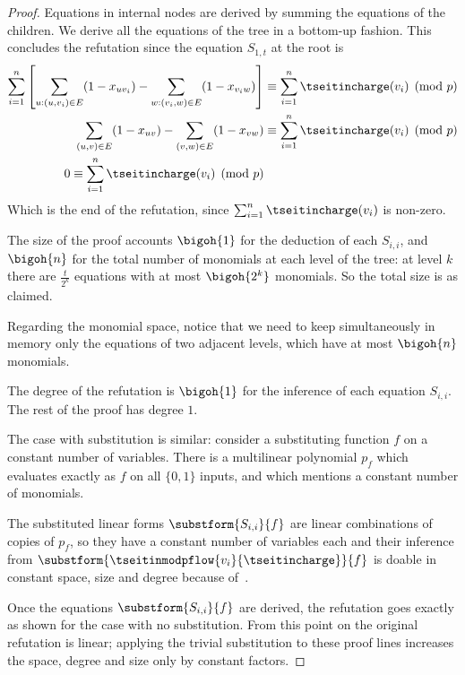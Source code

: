 \documentclass[11pt]{article}
\numberwithin{equation}{section}
\theoremstyle{definition}
\theoremstyle{plain}
\begin{document}
\begin{proof}
  Equations in internal nodes are derived by summing the
  equations of the children. We derive all the equations of the tree
  in a bottom-up fashion. This concludes the refutation since the
  equation $S_{1,t}$ at the root is
  \begin{align}
    \sum^{n}_{i=1}
    \left[
    \sum_{u:(u,v_{i})\in E} (1-x_{uv_{i}}) -\sum_{w:(v_{i},w)\in E} (1-x_{v_{i}w})
    \right]
    & \equiv \sum^{n}_{i=1} \tseitincharge(v_{i}) \pmod{p}
    \\
    \sum_{(u,v)\in E} (1-x_{uv}) -\sum_{(v,w)\in E} (1-x_{vw})
    & \equiv \sum^{n}_{i=1} \tseitincharge(v_{i}) \pmod{p}\\
    0 \equiv \sum^{n}_{i=1} \tseitincharge(v_{i}) \pmod{p}
  \end{align}
  Which is the end of the refutation, since $\sum^{n}_{i=1} \tseitincharge(v_{i})$
  is non-zero.

  The size of the proof accounts $\bigoh{1}$ for the deduction of each $S_{i,i}$, and $\bigoh{n}$ for the total number of monomials at each level of the tree: at level $k$ there are $\frac{t}{2^{k}}$ equations with at most  $\bigoh{2^{k}}$ monomials. So the total size is as claimed.

  Regarding the monomial space, notice that we need to keep simultaneously in memory only the equations of two adjacent levels, which have at most $\bigoh{n}$ monomials.

  The degree of the refutation is $\bigoh{1}$ for the inference of each equation $S_{i,i}$. The rest of the proof has degree $1$.

  The case with substitution is similar: consider a substituting
  function $f$ on a constant number of variables. There is a
  multilinear polynomial $p_{f}$ which evaluates exactly as $f$ on all
  $\{0,1\}$ inputs, and which mentions a constant number of monomials.

  The substituted linear forms $\substform{S_{i,i}}{f}$ are linear
  combinations of copies of $p_{f}$, so they have a constant
  number of variables each and their inference from
  $\substform{\tseitinmodpflow{v_{i}}{\tseitincharge}}{f}$ is doable in constant
  space, size and degree because of~.

  Once the equations $\substform{S_{i,i}}{f}$ are derived, the
  refutation goes exactly as shown for the case with no
  substitution. From this point on the original refutation is linear;
  applying the trivial substitution to these proof lines increases the
  space, degree and size only by constant factors.
\end{proof}
\end{document}
